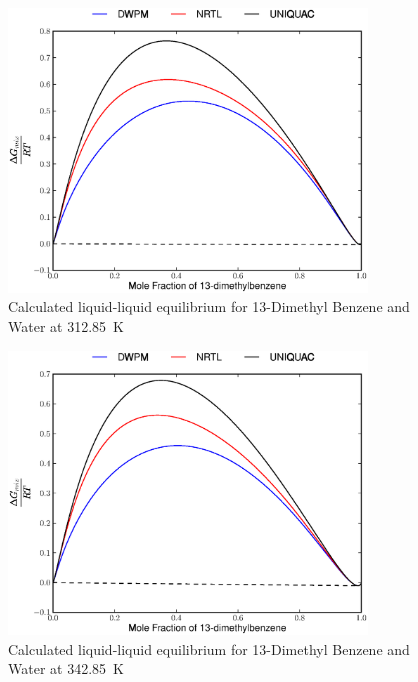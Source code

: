\begin{figure}[hp]
\centering
\includegraphics[width = 0.85\textwidth]{Results_Parts/BinaryParams/13-dimethylbenzene-water/AllModelsGibbsPlots/T_312.85.eps}
\caption{Calculated liquid-liquid equilibrium for 13-Dimethyl Benzene and Water at 312.85~$\mathrm{K}$} 
\end{figure}

\begin{figure}[hp]
\centering
\includegraphics[width = 0.85\textwidth]{Results_Parts/BinaryParams/13-dimethylbenzene-water/AllModelsGibbsPlots/T_342.85.eps}
\caption{Calculated liquid-liquid equilibrium for 13-Dimethyl Benzene and Water at 342.85~$\mathrm{K}$} 
\end{figure}

\clearpage

